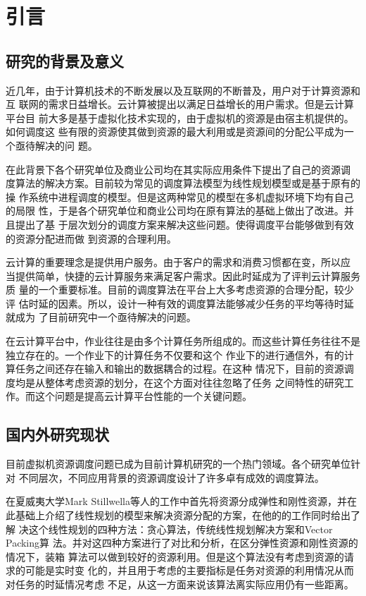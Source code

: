 

\chapter{引言}
\label{chap:introduction}


\section{研究的背景及意义}
近几年，由于计算机技术的不断发展以及互联网的不断普及，用户对于计算资源和互
联网的需求日益增长。云计算被提出以满足日益增长的用户需求。但是云计算平台目
前大多是基于虚拟化技术实现的，由于虚拟机的资源是由宿主机提供的。如何调度这
些有限的资源使其做到资源的最大利用或是资源间的分配公平成为一个亟待解决的问
题。

在此背景下各个研究单位及商业公司均在其实际应用条件下提出了自己的资源调
度算法的解决方案。目前较为常见的调度算法模型为线性规划模型或是基于原有的操
作系统中进程调度的模型。但是这两种常见的模型在多机虚拟环境下均有自己的局限
性，于是各个研究单位和商业公司均在原有算法的基础上做出了改进。并且提出了基
于层次划分的调度方案来解决这些问题。使得调度平台能够做到有效的资源分配进而做
到资源的合理利用。

云计算的重要理念是提供用户服务。由于客户的需求和消费习惯都在变，所以应
当提供简单，快捷的云计算服务来满足客户需求。因此时延成为了评判云计算服务质
量的一个重要标准。目前的调度算法在平台上大多考虑资源的合理分配，较少评
估时延的因素。所以，设计一种有效的调度算法能够减少任务的平均等待时延就成为
了目前研究中一个亟待解决的问题。

在云计算平台中，作业往往是由多个计算任务所组成的。而这些计算任务往往不是独立存在的。一个作业下的计算任务不仅要和这个
作业下的进行通信外，有的计算任务之间还存在输入和输出的数据耦合的过程。在这种
情况下，目前的资源调度均是从整体考虑资源的划分，在这个方面对往往忽略了任务
之间特性的研究工作。而这个问题是提高云计算平台性能的一个关键问题。

\section{国内外研究现状}
目前虚拟机资源调度问题已成为目前计算机研究的一个热门领域。各个研究单位针对
不同层次，不同应用背景的资源调度设计了许多卓有成效的调度算法。

在夏威夷大学Mark Stillwella等人的工作中首先将资源分成弹性和刚性资源，并在
此基础上介绍了线性规划的模型来解决资源分配的方案，在他的的工作同时给出了解
决这个线性规划的四种方法：贪心算法，传统线性规划解决方案和Vector Packing算
法。并对这四种方案进行了对比和分析，在区分弹性资源和刚性资源的情况下，装箱
算法可以做到较好的资源利用。但是这个算法没有考虑到资源的请求的可能是实时变
化的，并且用于考虑的主要指标是任务对资源的利用情况从而对任务的时延情况考虑
不足，从这一方面来说该算法离实际应用仍有一些距离。

